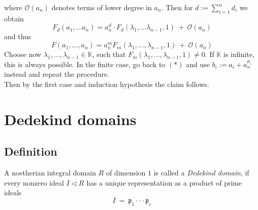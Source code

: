 \documentclass[12pt]{book}
\begin{document}
\begin{spacing}{1.3}
\begin{compactenum}
\begin{compactenum}
where $\mathcal{O}(a_n)$ denotes terms of lower degree in $a_n$. Then for $d:= \sum_{i=1}^n d_i$ we obtain
$$F_d(a_1, \ldots a_n)= a_n^d \cdot F_d(\lambda_1, \ldots \lambda_{n-1}, 1 ) \ + \ \mathcal{O}(a_n)$$
and thus
$$F(a_1, \ldots, a_n)=a_n^m F_m(\lambda_1, \ldots, \lambda_{n-1},1) \ + \ \mathcal{O}(a_n)$$
Choose now $\lambda_1, \ldots, \lambda_{n-1} \in \mathbb{K}$, such that $F_m(\lambda_1, \ldots, \lambda_{n-1},1) \neq 0$. If $\mathbb{K}$ is infinite, this is always possible. In the finite case, go back to $(*)$ and use $b_i:=a_i+a_n^{\mu_i}$ instead and repeat the procedure.\\
Then by the first case and induction hypothesis the claim follows.
\end{compactenum}
\end{compactenum}



\renewcommand*\thesection{\S\ \arabic{section}\quad }
\section{Dedekind domains}
\renewcommand*\thesection{\arabic{section}}

\subsection{Definition} %
A noetherian integral domain $R$ of dimension $1$ is called a \textit{Dedekind domain}, if every nonzero ideal $I \triangleleft R$ has a unique representation as a product of prime ideals
$$I \ = \ \mathfrak{p}_1 \cdot \cdot \cdot \mathfrak{p}_r$$


\end{spacing}
\end{document}
